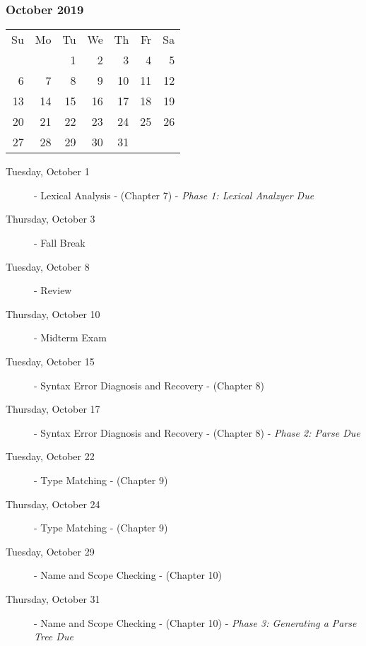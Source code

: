 \subsubsection*{October 2019}
\begin{tabular}{rrrrrrr}
Su & Mo & Tu & We & Th & Fr & Sa\\
   &    &  1 &  2 &  3 &  4 &  5\\
 6 &  7 &  8 &  9 & 10 & 11 & 12\\
13 & 14 & 15 & 16 & 17 & 18 & 19\\ 
20 & 21 & 22 & 23 & 24 & 25 & 26\\ 
27 & 28 & 29 & 30 & 31 &    &   \\
\end{tabular}
\begin{description}
\item[Tuesday, October 1]
    - Lexical Analysis 
    \newline - (Chapter 7)
    \newline - {\em Phase 1: Lexical Analzyer Due}
\item[Thursday, October 3] - Fall Break

\item[Tuesday, October 8] 
    - Review
\item[Thursday, October 10]
    - Midterm Exam

\item[Tuesday, October 15]
    - Syntax Error Diagnosis and Recovery
    \newline - (Chapter 8)
\item[Thursday, October 17]
    - Syntax Error Diagnosis and Recovery
    \newline - (Chapter 8)
    \newline - {\em Phase 2: Parse Due}

\item[Tuesday, October 22]
    - Type Matching
    \newline - (Chapter 9)
\item[Thursday, October 24]
    - Type Matching
    \newline - (Chapter 9)

\item[Tuesday, October 29]
    - Name and Scope Checking
    \newline - (Chapter 10)
\item[Thursday, October 31]
    - Name and Scope Checking
    \newline - (Chapter 10)
    \newline - {\em Phase 3: Generating a Parse Tree Due}

\end{description}

